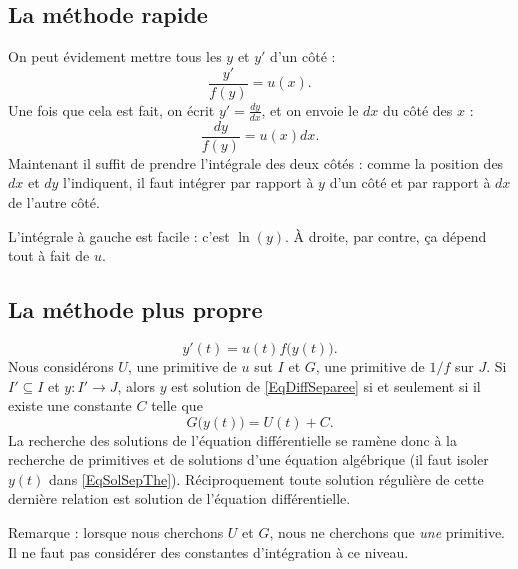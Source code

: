 \subsection{La méthode rapide}

On peut évidement mettre tous les $y$ et $y'$ d'un côté :
\begin{equation}
	\frac{ y' }{ f(y) }=u(x).
\end{equation}
Une fois que cela est fait, on écrit $y'=\frac{ dy }{ dx }$, et on envoie le $dx$ du côté des $x$ :
\begin{equation}
	\frac{ dy }{ f(y) }=u(x)dx.
\end{equation}
Maintenant il suffit de prendre l'intégrale des deux côtés : comme la position des $dx$ et $dy$ l'indiquent, il faut intégrer par rapport à $y$ d'un côté et par rapport à $dx$ de l'autre côté.

L'intégrale à gauche est facile : c'est $\ln(y)$. À droite, par contre, ça dépend tout à fait de $u$.

\subsection{La méthode plus propre}

\begin{equation}
	y'(t)=u(t)f\big( y(t) \big).
\end{equation}
Nous considérons $U$, une primitive de $u$ sut $I$ et $G$, une primitive de $1/f$ sur $J$. Si $I'\subseteq I$ et $y\colon I'\to J$, alors $y$ est solution de \eqref{EqDiffSeparee} si et seulement si il existe une constante $C$ telle que
\begin{equation}		\label{EqSolSepThe}
	G\big( y(t) \big)=U(t)+C.
\end{equation}
La recherche des solutions de l'équation différentielle se ramène donc à la recherche de primitives et de solutions d'une équation algébrique (il faut isoler $y(t)$ dans \eqref{EqSolSepThe}). Réciproquement toute solution régulière de cette dernière relation est solution de l'équation différentielle.

Remarque : lorsque nous cherchons $U$ et $G$, nous ne cherchons que \emph{une} primitive. Il ne faut pas considérer des constantes d'intégration à ce niveau.

